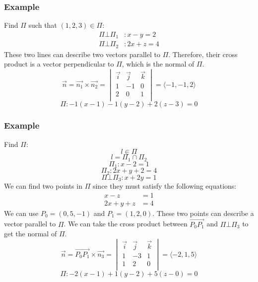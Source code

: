 \documentclass[letterpaper, 12pt]{math}
\begin{document}
\subsubsection*{Example}
Find \( \Pi \) such that \( (1,2,3)\in\Pi \):
\begin{align*}
  \Pi\bot\Pi_1&: x-y = 2 \\
  \Pi\bot\Pi_2&: 2x+z = 4
\end{align*}
These two lines can describe two vectors parallel to \( \Pi \). Therefore, their
cross product is a vector perpendicular to \( \Pi \), which is the normal of
\( \Pi \).
\[ \vec{n} = \vec{n_1}\times\vec{n_2} = \begin{vmatrix}
  \vec{i} & \vec{j} & \vec{k} \\
  1 & -1 & 0 \\
  2 & 0 & 1 \\
\end{vmatrix} = \langle-1,-1,2\rangle \]
\[ \Pi: -1(x-1)-1(y-2)+2(z-3) = 0 \]

\subsubsection*{Example}
Find \( \Pi \):
\[ l\in\Pi \]
\[ l = \Pi_1\cap\Pi_2 \]
\[ \Pi_1:x-2 = 1 \]
\[ \Pi_2:2x+y+2 = 4 \]
\[ \Pi\bot\Pi_3: x+2y = 1 \]
We can find two points in \( \Pi \) since they must satisfy the following
equations:
\begin{align*}
  x-z &= 1 \\
  2x+y+z &= 4
\end{align*}
We can use \( P_0 = (0,5,-1) \) and \( P_1 = (1,2,0) \). These two points can
describe a vector parallel to \( \Pi \). We can take the cross product between
\( \overrightarrow{P_0P_1} \) and \( \Pi\bot\Pi_3 \) to get the normal of
\( \Pi \).
\[ \vec{n} = \overrightarrow{P_0P_1}\times\vec{n_3} = \begin{vmatrix}
  \vec{i} & \vec{j} & \vec{k} \\
  1 & -3 & 1 \\
  1 & 2 & 0 \\
\end{vmatrix} = \langle-2,1,5\rangle \]
\[ \Pi: -2(x-1)+1(y-2)+5(z-0) = 0 \]
\end{document}
